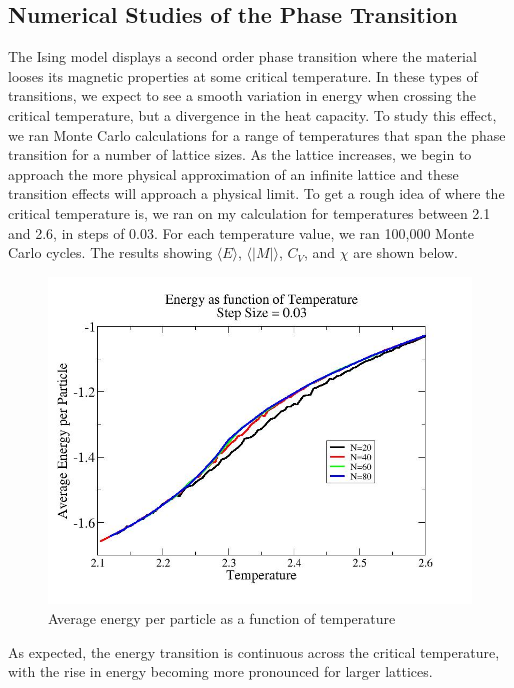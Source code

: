 \documentclass[%
oneside,                 %
final,                   %
10pt]{article}
\begin{document}
\subsection{Numerical Studies of the Phase Transition}

The Ising model displays a second order phase transition where the material looses its magnetic properties at some critical temperature.  In these types of transitions, we expect to see a smooth variation in energy when crossing the critical temperature, but a divergence in the heat capacity.  To study this effect, we ran Monte Carlo calculations for a range of temperatures that span the phase transition for a number of lattice sizes.  As the lattice increases, we begin to approach the more physical approximation of an infinite lattice and these transition effects will approach a physical limit.  To get a rough idea of where the critical temperature is, we ran on my calculation for temperatures between 2.1 and 2.6, in steps of 0.03.  For each temperature value, we ran 100,000 Monte Carlo cycles.  The results showing $\langle E \rangle$, $\langle |M| \rangle$, $C_V$, and $\chi$ are shown below.

\begin{figure}[H]\label{fig:looseE}
  \centering
    \includegraphics[width=0.85 \textwidth]{20energyloose.jpg}
    \caption{Average energy per particle as a function of temperature}
\end{figure}

As expected, the energy transition is continuous across the critical temperature, with the rise in energy becoming more pronounced for larger lattices.  
\end{document}
